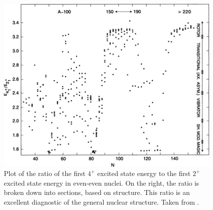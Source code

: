 \begin{figure}
    \centering
    \includegraphics[scale=2]{Introduction_Figs/E4E2RatioCasten.png}
    \caption{Plot of the ratio of the first $4^+$ excited state energy to the first $2^+$ excited state energy in even-even nuclei. On the right, the ratio is broken down into sections, based on structure. This ratio is an excellent diagnostic of the general nuclear structure. Taken from \citep{casten90:_structure}.}
    \label{fig:E4E2}
\end{figure}